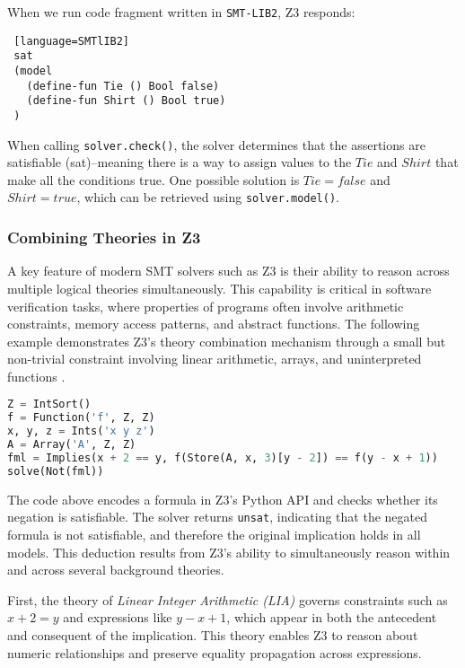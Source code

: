 \documentclass[]{rptuseminar}
\begin{document}
\vspace{1em}

When we run code fragment written in \texttt{SMT-LIB2}, Z3 responds:
\begin{lstlisting} [language=SMTlIB2]
 sat
 (model
   (define-fun Tie () Bool false)
   (define-fun Shirt () Bool true)
 )
\end{lstlisting}
\vspace{1em}


When calling \texttt{solver.check()}, the solver determines that the assertions are satisfiable
(sat)--meaning there is a way to assign values to the \(Tie\) and \(Shirt\) that make all the 
conditions true. One possible solution is \(Tie = false\) and \(Shirt = true\), 
which can be retrieved using \texttt{solver.model()}.
\vspace{1em}


\subsubsection{Combining Theories in Z3}

A key feature of modern SMT solvers such as Z3 is their ability to reason across multiple logical theories simultaneously. 
This capability is critical in software verification tasks, where properties of programs often involve 
arithmetic constraints, memory access patterns, and abstract functions. 
The following example demonstrates Z3’s theory combination mechanism through a small but non-trivial 
constraint involving linear arithmetic, arrays, and uninterpreted functions \cite{nikolaj_bjorner_programming_nodate}.

\begin{lstlisting}[language=Python, label={lst:combined-theories}]
Z = IntSort()
f = Function('f', Z, Z)
x, y, z = Ints('x y z')
A = Array('A', Z, Z)
fml = Implies(x + 2 == y, f(Store(A, x, 3)[y - 2]) == f(y - x + 1))
solve(Not(fml))

\end{lstlisting}
\vspace{1em}

The code above encodes a formula in Z3’s Python API and checks whether its negation is satisfiable. The solver returns \texttt{unsat}, indicating that the negated formula is not satisfiable, and therefore the original implication holds in all models. This deduction results from Z3’s ability to simultaneously reason within and across several background theories.

First, the theory of \emph{Linear Integer Arithmetic (LIA)} governs constraints such as \(x + 2 = y\) and expressions like \(y - x + 1\), which appear in both the antecedent and consequent of the implication. This theory enables Z3 to reason about numeric relationships and preserve equality propagation across expressions.
\end{document}
